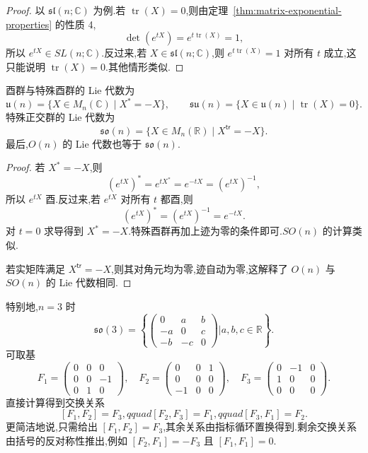 {\begin{proof}
以 $\mathfrak{sl}(n;\mathbb C)$ 为例.若 $\operatorname{tr}(X)=0$,则由定理~\ref{thm:matrix-exponential-properties} 的性质 4,
\[
\det(e^{tX})=e^{t\operatorname{tr}(X)}=1,
\]
所以 $e^{tX}\in SL(n;\mathbb C)$.反过来,若 $X\in\mathfrak{sl}(n;\mathbb C)$,则 $e^{t\operatorname{tr}(X)}=1$ 对所有 $t$ 成立,这只能说明 $\operatorname{tr}(X)=0$.其他情形类似.
\end{proof}

\begin{example}\label{ex:unitary-orthogonal-lie-algebras}
酉群与特殊酉群的 Lie 代数为
\[
\mathfrak u(n)=\{X\in M_n(\mathbb C)\mid X^*=-X\},
\qquad
\mathfrak{su}(n)=\{X\in\mathfrak u(n)\mid\operatorname{tr}(X)=0\}.
\]
特殊正交群的 Lie 代数为
\[
\mathfrak{so}(n)=\{X\in M_n(\mathbb R)\mid X^{\mathsf{tr}}=-X\}.
\]
最后,$O(n)$ 的 Lie 代数也等于 $\mathfrak{so}(n)$.
\end{example}

\begin{proof}
若 $X^*=-X$,则
\[
(e^{tX})^*=e^{tX^*}=e^{-tX}=(e^{tX})^{-1},
\]
所以 $e^{tX}$ 酉.反过来,若 $e^{tX}$ 对所有 $t$ 都酉,则
\[
(e^{tX})^*=(e^{tX})^{-1}=e^{-tX}.
\]
对 $t=0$ 求导得到 $X^*=-X$.特殊酉群再加上迹为零的条件即可.$SO(n)$ 的计算类似.

若实矩阵满足 $X^{\mathsf{tr}}=-X$,则其对角元均为零,迹自动为零,这解释了 $O(n)$ 与 $SO(n)$ 的 Lie 代数相同.
\end{proof}

特别地,$n=3$ 时
\[
\mathfrak{so}(3)=\left\{
\begin{pmatrix}0&a&b\\-a&0&c\\-b&-c&0\end{pmatrix}\mathrel{\Big|}a,b,c\in\mathbb R
\right\}.
\]
可取基
\[
F_1=\begin{pmatrix}0&0&0\\0&0&-1\\0&1&0\end{pmatrix},\quad
F_2=\begin{pmatrix}0&0&1\\0&0&0\\-1&0&0\end{pmatrix},\quad
F_3=\begin{pmatrix}0&-1&0\\1&0&0\\0&0&0\end{pmatrix}.
\label{eq:so3-basis}
\]
直接计算得到交换关系
\[
[F_1,F_2]=F_3,qquad [F_2,F_3]=F_1,qquad [F_3,F_1]=F_2.
\label{eq:so3-commutators}
\]
更简洁地说,只需给出 $[F_1,F_2]=F_3$,其余关系由指标循环置换得到.剩余交换关系由括号的反对称性推出,例如 $[F_2,F_1]=-F_3$ 且 $[F_1,F_1]=0$.
}

